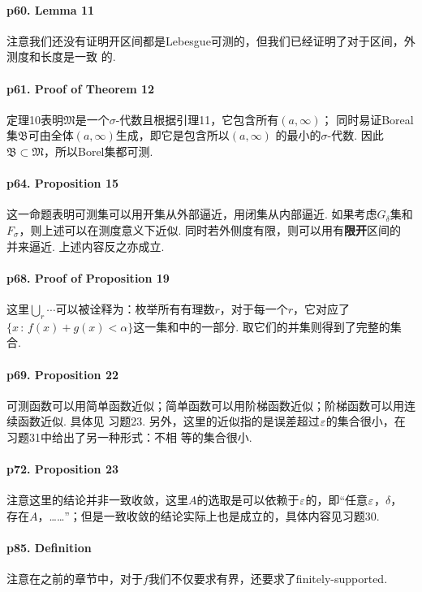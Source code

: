   \paragraph{p60. Lemma 11}
    注意我们还没有证明开区间都是Lebesgue可测的，但我们已经证明了对于区间，外测度和长度是一致
    的. 

  \paragraph{p61. Proof of Theorem 12}
    定理10表明$\mathfrak{M}$是一个$\sigma$-代数且根据引理11，它包含所有$(a,\infty)$；
    同时易证Boreal集$\mathfrak{B}$可由全体$(a,\infty)$生成，即它是包含所以$(a,\infty)$
    的最小的$\sigma$-代数. 因此$\mathfrak{B}\subset\mathfrak{M}$，所以Borel集都可测. 

  \paragraph{p64. Proposition 15}
    这一命题表明可测集可以用开集从外部逼近，用闭集从内部逼近. 如果考虑$G_\delta$集和
    $F_\sigma$，则上述可以在测度意义下近似. 同时若外侧度有限，则可以用有\textbf{限开}区间的
    并来逼近. 上述内容反之亦成立. 

  \paragraph{p68. Proof of Proposition 19}
    这里$\bigcup_r\cdots$可以被诠释为：枚举所有有理数$r$，对于每一个$r$，它对应了$\{x\,:
    \,f(x)+g(x)<\alpha\}$这一集和中的一部分. 取它们的并集则得到了完整的集合. 

  \paragraph{p69. Proposition 22}
    可测函数可以用简单函数近似；简单函数可以用阶梯函数近似；阶梯函数可以用连续函数近似. 具体见
    习题23. 另外，这里的近似指的是误差超过$\varepsilon$的集合很小，在习题31中给出了另一种形式：不相
    等的集合很小. 

  \paragraph{p72. Proposition 23}
    注意这里的结论并非一致收敛，这里$A$的选取是可以依赖于$\varepsilon$的，即“任意$\varepsilon$，$\delta$，
    存在$A$，……”；但是一致收敛的结论实际上也是成立的，具体内容见习题30.

  \paragraph{p85. Definition}
    注意在之前的章节中，对于$f$我们不仅要求有界，还要求了finitely-supported.

